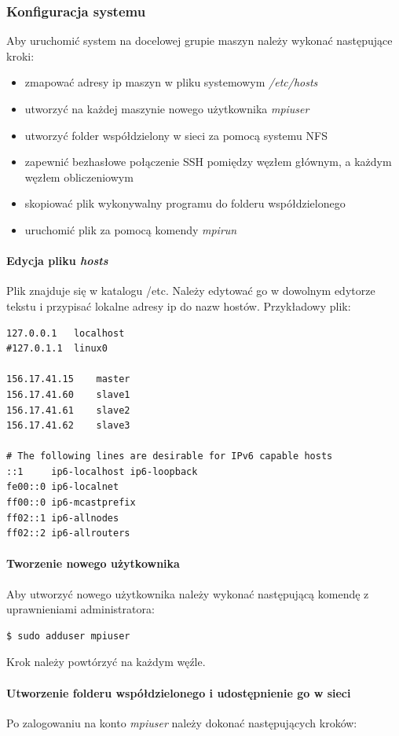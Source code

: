 \documentclass{article}
\begin{document}
\subsubsection{Konfiguracja systemu}
Aby uruchomić system na docelowej grupie maszyn należy wykonać następujące kroki:
\begin{itemize}
\item zmapować adresy ip maszyn w pliku systemowym \textit{/etc/hosts}
\item utworzyć na każdej maszynie nowego użytkownika \textit{mpiuser}
\item utworzyć folder współdzielony w sieci za pomocą systemu NFS
\item zapewnić bezhasłowe połączenie SSH pomiędzy węzłem głównym, a każdym węzłem obliczeniowym
\item skopiować plik wykonywalny programu do folderu współdzielonego
\item uruchomić plik za pomocą komendy \textit{mpirun}
\end{itemize}
\newpage
\paragraph{Edycja pliku \textit{hosts}}

Plik znajduje się w katalogu /etc. Należy edytować go w dowolnym edytorze tekstu i przypisać lokalne adresy ip do nazw hostów. Przykładowy plik:
\begin{lstlisting}
127.0.0.1	localhost
#127.0.1.1	linux0

156.17.41.15	master
156.17.41.60	slave1
156.17.41.61	slave2
156.17.41.62	slave3

# The following lines are desirable for IPv6 capable hosts
::1     ip6-localhost ip6-loopback
fe00::0 ip6-localnet
ff00::0 ip6-mcastprefix
ff02::1 ip6-allnodes
ff02::2 ip6-allrouters
\end{lstlisting}

\paragraph{Tworzenie nowego użytkownika}

Aby utworzyć nowego użytkownika należy wykonać następującą komendę z uprawnieniami administratora:
\begin{lstlisting}
$ sudo adduser mpiuser
\end{lstlisting}

Krok należy powtórzyć na każdym węźle.

\paragraph{Utworzenie folderu współdzielonego i udostępnienie go w sieci}
Po zalogowaniu na konto \textit{mpiuser} należy dokonać następujących kroków:
\end{document}
